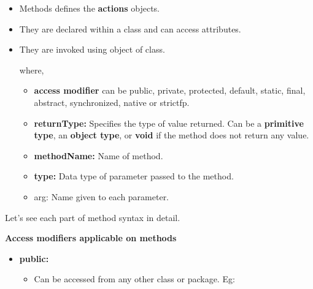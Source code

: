 \setlength{\columnsep}{3pt}
\begin{flushleft}
	
	\begin{itemize}
		\item Methods defines the \textbf{actions} objects.
		\item They are declared within a class and can access attributes.
		\item They are invoked using object of class.
		\bigskip
		
		where,
		\begin{itemize}
			\item \textbf{access modifier} can be public, private, protected, default, static, final, abstract, synchronized, native or strictfp.
			\item \textbf{returnType:} Specifies the type of value returned. Can be a \textbf{primitive type}, an \textbf{object type}, or \textbf{void} if the method does not return any value.
			\item \textbf{methodName:} Name of method.
			\item \textbf{type:} Data type of parameter passed to the method.
			\item arg: Name given to each parameter.
		\end{itemize}
		
	\end{itemize}

	Let's see each part of method syntax in detail.
	
	\newpage
	
	\textbf{Access modifiers applicable on methods}
	\begin{itemize}
		\item \textbf{public:}
		\begin{itemize}
			\item Can be accessed from any other class or package. Eg:
		\end{itemize}
	

\end{itemize}
\end{flushleft}
